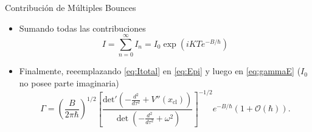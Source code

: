 \documentclass{beamer}
\theoremstyle{example}
\theoremstyle{example}
\begin{document}
\begin{frame}{Contribución de Múltiples Bounces}
\begin{itemize}
    \item Sumando todas las contribuciones
    \begin{equation}\label{eq:Itotal}
        I = \sum_{n = 0}^{\infty} I_n = I_0 \exp{\left(iKTe^{-B/\hbar}\right)}
    \end{equation}
    
    \item Finalmente, reeemplazando \eqref{eq:Itotal} en \eqref{eq:Epi} y luego en \eqref{eq:gammaE} ($I_0$ no posee parte imaginaria)
    \begin{equation}
        \boxed{\Gamma = \left(\frac{B}{2\pi\hbar}\right)^{1/2}  \left[ \frac{\textrm{det}' \left(-\frac{d^2}{d\tau^2} + V''(x_{\textrm{cl}}) \right)}{\det \left(-\frac{d^2}{d\tau^2} + \omega^2 \right)}\right]^{-1/2}e^{-B/\hbar}\left( 1 + \mathcal{O}(\hbar)\right)}.
\end{equation}
\end{itemize}
\end{frame}
\end{document}
